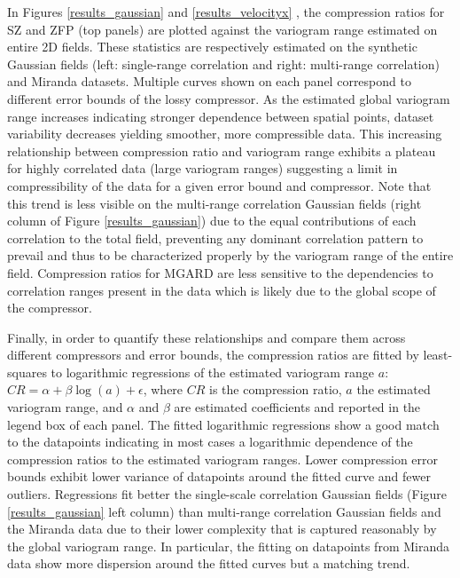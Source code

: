 \documentclass[conference]{IEEEtran}
\begin{document}
In Figures \ref{results_gaussian} and \ref{results_velocityx} , the compression ratios for SZ\cite{Liang2018} and ZFP\cite{Lindstrom2006} (top panels) are plotted against the variogram range estimated  on  entire 2D fields.   
These statistics are respectively estimated on the synthetic Gaussian fields (left: single-range correlation and right: multi-range correlation) and Miranda datasets. 
Multiple curves shown on each panel correspond to different error bounds of the lossy compressor. 
As the estimated global variogram range increases indicating stronger dependence between spatial points, dataset variability decreases yielding smoother, more compressible data.  
This increasing relationship between compression ratio and variogram range exhibits a plateau for highly correlated data  (large variogram ranges) suggesting a limit in compressibility of the data for a given error bound and compressor. 
Note that this trend is less visible on the  multi-range correlation Gaussian fields (right column of Figure \ref{results_gaussian}) due to the equal contributions of each correlation to the total field, preventing  any  dominant correlation pattern to  prevail and thus to be characterized  properly by  the variogram range of the entire field. 
Compression ratios for MGARD\cite{Ainsworth2019} are less sensitive to the dependencies  to correlation ranges present in the data which is likely due to the global scope of the compressor. 

Finally, in order to quantify these relationships and compare them across different compressors and error bounds, the compression ratios are fitted by least-squares to logarithmic regressions of the estimated variogram range $a$: $CR = \alpha +\beta \log(a) +\epsilon$, where $CR$ is the compression ratio, $a$ the estimated variogram range, and $\alpha$ and $\beta$ are estimated coefficients and reported in the legend box of each panel.   
The fitted logarithmic regressions show a good match  to the datapoints indicating in most cases a logarithmic dependence of the compression ratios to the estimated variogram ranges. 
Lower compression error bounds exhibit lower variance of datapoints around the fitted curve and fewer outliers. 
Regressions fit better the single-scale correlation Gaussian fields (Figure \ref{results_gaussian} left column) than multi-range correlation Gaussian fields and the Miranda data due to their lower complexity that is captured reasonably by the global variogram range.  
In particular, the fitting on datapoints from  Miranda data show more dispersion around the fitted curves but a matching trend. 
\end{document}
